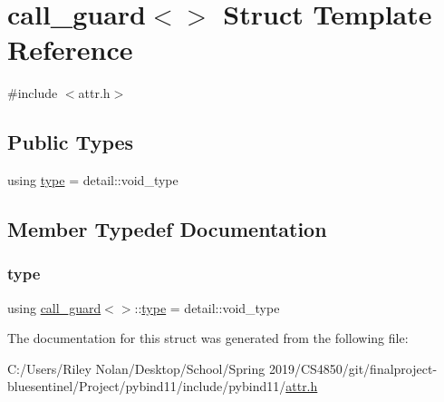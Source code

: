\hypertarget{structcall__guard_3_4}{}\section{call\+\_\+guard$<$$>$ Struct Template Reference}
\label{structcall__guard_3_4}


{\ttfamily \#include $<$attr.\+h$>$}

\subsection*{Public Types}
\begin{DoxyCompactItemize}
\item 
using \mbox{\hyperlink{structcall__guard_3_4_a3587652120c0abe2ddf5dad3900ea47b}{type}} = detail\+::void\+\_\+type
\end{DoxyCompactItemize}


\subsection{Member Typedef Documentation}
\mbox{\label{structcall__guard_3_4_a3587652120c0abe2ddf5dad3900ea47b}} 
\subsubsection{\texorpdfstring{type}{type}}
{\footnotesize\ttfamily using \mbox{\hyperlink{structcall__guard}{call\+\_\+guard}}$<$$>$\+::\mbox{\hyperlink{structcall__guard_3_4_a3587652120c0abe2ddf5dad3900ea47b}{type}} =  detail\+::void\+\_\+type}



The documentation for this struct was generated from the following file\+:\begin{DoxyCompactItemize}
\item 
C\+:/\+Users/\+Riley Nolan/\+Desktop/\+School/\+Spring 2019/\+C\+S4850/git/finalproject-\/bluesentinel/\+Project/pybind11/include/pybind11/\mbox{\hyperlink{attr_8h}{attr.\+h}}\end{DoxyCompactItemize}
